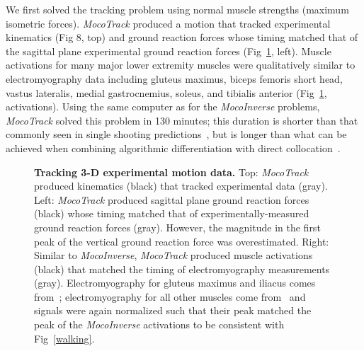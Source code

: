 \documentclass[10pt,letterpaper]{article}
\begin{document}
We first solved the tracking problem using normal muscle strengths (maximum isometric forces). \textit{MocoTrack} produced a motion that tracked experimental kinematics (Fig 8, top) and ground reaction forces whose timing matched that of the sagittal plane experimental ground reaction forces (Fig~\ref{tracking}, left). Muscle activations for many major lower extremity muscles were qualitatively similar to electromyography data including gluteus maximus, biceps femoris short head, vastus lateralis, medial gastrocnemius, soleus, and tibialis anterior (Fig~\ref{tracking}, activations). Using the same computer as for the \textit{MocoInverse} problems, \textit{MocoTrack} solved this problem in 130 minutes; this duration is shorter than that commonly seen in single shooting predictions~\cite{Ong:2019}, but is longer than what can be achieved when combining algorithmic differentiation with direct collocation~\cite{Falisse:2019b}.

\begin{figure}[!h]
    \centering
    \caption{{\bf Tracking 3-D experimental motion data.}
        Top: \textit{MocoTrack} produced kinematics (black) that tracked experimental data (gray). Left: \textit{MocoTrack} produced sagittal plane ground reaction forces (black) whose timing matched that of experimentally-measured ground reaction forces (gray). However, the magnitude in the first peak of the vertical ground reaction force was overestimated. Right: Similar to \textit{MocoInverse}, \textit{MocoTrack} produced muscle activations (black) that matched the timing of electromyography measurements (gray). Electromyography for gluteus maximus and iliacus comes from~\cite{Perry:2010}; electromyography for all other muscles come from~\cite{Rajagopal:2016ek} and signals were again normalized such that their peak matched the peak of the \textit{MocoInverse} activations to be consistent with Fig~\ref{walking}.
    }
    \label{tracking}
\end{figure}
\end{document}
